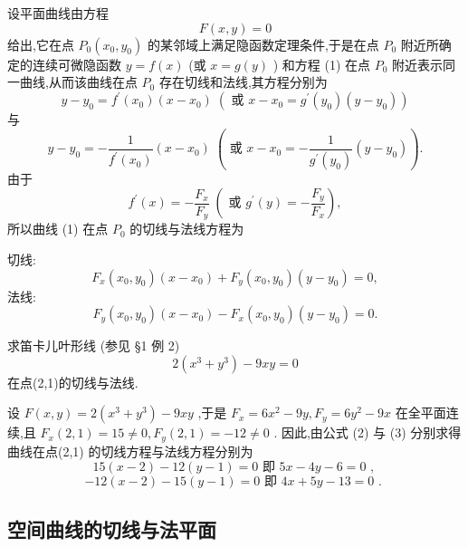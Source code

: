设平面曲线由方程
\[
F\left( {x,y}\right)  = 0 \tag{1}
\]
给出,它在点 \({P}_{0}\left( {{x}_{0},{y}_{0}}\right)\) 的某邻域上满足隐函数定理条件,于是在点 \({P}_{0}\) 附近所确定的连续可微隐函数 \(y = f\left( x\right)\) (或 \(x = g\left( y\right)\) ) 和方程 (1) 在点 \({P}_{0}\) 附近表示同一曲线,从而该曲线在点 \({P}_{0}\) 存在切线和法线,其方程分别为
\[
y - {y}_{0} = {f}^{\prime }\left( {x}_{0}\right) \left( {x - {x}_{0}}\right) \;\left( {\text{ 或 }x - {x}_{0} = {g}^{\prime }\left( {y}_{0}\right) \left( {y - {y}_{0}}\right) }\right)
\]
与
\[
y - {y}_{0} =  - \frac{1}{{f}^{\prime }\left( {x}_{0}\right) }\left( {x - {x}_{0}}\right) \;\left( {\text{ 或 }x - {x}_{0} =  - \frac{1}{{g}^{\prime }\left( {y}_{0}\right) }\left( {y - {y}_{0}}\right) }\right) .
\]
由于
\[
{f}^{\prime }\left( x\right)  =  - \frac{{F}_{x}}{{F}_{y}}\;\left( {\text{ 或 }{g}^{\prime }\left( y\right)  =  - \frac{{F}_{y}}{{F}_{x}}}\right) ,
\]
所以曲线 (1) 在点 \({P}_{0}\) 的切线与法线方程为

切线:
\[
{F}_{x}\left( {{x}_{0},{y}_{0}}\right) \left( {x - {x}_{0}}\right)  + {F}_{y}\left( {{x}_{0},{y}_{0}}\right) \left( {y - {y}_{0}}\right)  = 0, \tag{2}
\]
法线:
\[
{F}_{y}\left( {{x}_{0},{y}_{0}}\right) \left( {x - {x}_{0}}\right)  - {F}_{x}\left( {{x}_{0},{y}_{0}}\right) \left( {y - {y}_{0}}\right)  = 0. \tag{3}
\]
\begin{example}

\end{example}
求笛卡儿叶形线 (参见 §1 例 2)
\[
2\left( {{x}^{3} + {y}^{3}}\right)  - {9xy} = 0
\]
在点(2,1)的切线与法线.

\begin{solution}

\end{solution}
设 \(F\left( {x,y}\right)  = 2\left( {{x}^{3} + {y}^{3}}\right)  - {9xy}\) ,于是 \({F}_{x} = 6{x}^{2} - {9y},{F}_{y} = 6{y}^{2} - {9x}\) 在全平面连续,且 \({F}_{x}\left( {2,1}\right)  = {15} \neq  0,{F}_{y}\left( {2,1}\right)  =  - {12} \neq  0\) . 因此,由公式 (2) 与 (3) 分别求得曲线在点(2,1) 的切线方程与法线方程分别为
\[
{15}\left( {x - 2}\right)  - {12}\left( {y - 1}\right)  = 0\text{ 即 }{5x} - {4y} - 6 = 0\text{ , }
\]
\[
- {12}\left( {x - 2}\right)  - {15}\left( {y - 1}\right)  = 0\text{ 即 }{4x} + {5y} - {13} = 0\text{ . }
\]
\subsection{空间曲线的切线与法平面}

